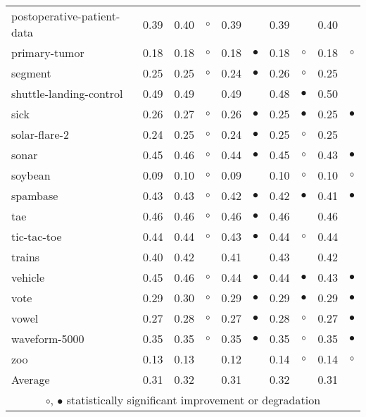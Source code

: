 \begin{table}[htb]
{\begin{tabular}{lrr@{\hspace{0.1cm}}cr@{\hspace{0.1cm}}cr@{\hspace{0.1cm}}cr@{\hspace{0.1cm}}c}
postoperative-patient-data & 0.39 & 0.40 &   $\circ$ & 0.39 &           & 0.39 &           & 0.40 &           \\
primary-tumor & 0.18 & 0.18 &   $\circ$ & 0.18 & $\bullet$ & 0.18 &   $\circ$ & 0.18 &    $\circ$\\
segment & 0.25 & 0.25 &   $\circ$ & 0.24 & $\bullet$ & 0.26 &   $\circ$ & 0.25 &           \\
shuttle-landing-control & 0.49 & 0.49 &           & 0.49 &           & 0.48 & $\bullet$ & 0.50 &           \\
sick & 0.26 & 0.27 &   $\circ$ & 0.26 & $\bullet$ & 0.25 & $\bullet$ & 0.25 &  $\bullet$\\
solar-flare-2 & 0.24 & 0.25 &   $\circ$ & 0.24 & $\bullet$ & 0.25 &   $\circ$ & 0.25 &           \\
sonar & 0.45 & 0.46 &   $\circ$ & 0.44 & $\bullet$ & 0.45 &   $\circ$ & 0.43 &  $\bullet$\\
soybean & 0.09 & 0.10 &   $\circ$ & 0.09 &           & 0.10 &   $\circ$ & 0.10 &    $\circ$\\
spambase & 0.43 & 0.43 &   $\circ$ & 0.42 & $\bullet$ & 0.42 & $\bullet$ & 0.41 &  $\bullet$\\
tae & 0.46 & 0.46 &   $\circ$ & 0.46 & $\bullet$ & 0.46 &           & 0.46 &           \\
tic-tac-toe & 0.44 & 0.44 &   $\circ$ & 0.43 & $\bullet$ & 0.44 &   $\circ$ & 0.44 &           \\
trains & 0.40 & 0.42 &           & 0.41 &           & 0.43 &           & 0.42 &           \\
vehicle & 0.45 & 0.46 &   $\circ$ & 0.44 & $\bullet$ & 0.44 & $\bullet$ & 0.43 &  $\bullet$\\
vote & 0.29 & 0.30 &   $\circ$ & 0.29 & $\bullet$ & 0.29 & $\bullet$ & 0.29 &  $\bullet$\\
vowel & 0.27 & 0.28 &   $\circ$ & 0.27 & $\bullet$ & 0.28 &   $\circ$ & 0.27 &  $\bullet$\\
waveform-5000 & 0.35 & 0.35 &   $\circ$ & 0.35 & $\bullet$ & 0.35 &   $\circ$ & 0.35 &  $\bullet$\\
zoo & 0.13 & 0.13 &           & 0.12 &           & 0.14 &   $\circ$ & 0.14 &    $\circ$\\
\hline
Average & 0.31 & 0.32 &           & 0.31 &           & 0.32 &           & 0.31 &           \\
\hline
\multicolumn{10}{c}{$\circ$, $\bullet$ statistically significant improvement or degradation}\\
\end{tabular} \footnotesize \par}
\end{table}
